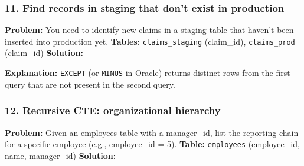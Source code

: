 \subsubsection{11. Find records in staging that don't exist in
production}\label{find-records-in-staging-that-dont-exist-in-production}

\textbf{Problem:} You need to identify new claims in a staging table
that haven't been inserted into production yet. \textbf{Tables:}
\texttt{claims\_staging} (claim\_id), \texttt{claims\_prod} (claim\_id)
\textbf{Solution:}

\begin{Shaded}
\begin{Highlighting}[]
\end{Highlighting}
\end{Shaded}

\textbf{Explanation:} \texttt{EXCEPT} (or \texttt{MINUS} in Oracle)
returns distinct rows from the first query that are not present in the
second query.

\subsubsection{12. Recursive CTE: organizational
hierarchy}\label{recursive-cte-organizational-hierarchy}

\textbf{Problem:} Given an employees table with a manager\_id, list the
reporting chain for a specific employee (e.g., employee\_id = 5).
\textbf{Table:} \texttt{employees} (employee\_id, name, manager\_id)
\textbf{Solution:}

\begin{Shaded}
\begin{Highlighting}[]
\NormalTok{ (}
      
    \OperatorTok{=} 
     
     \OperatorTok{+} 
    \OperatorTok{=}
\NormalTok{)}
 \OperatorTok{*} 
\end{Highlighting}
\end{Shaded}

